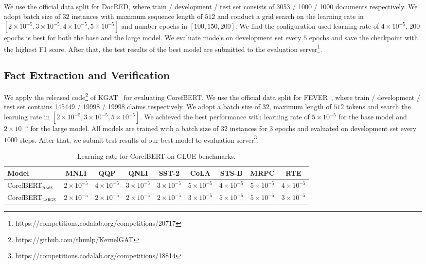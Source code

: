 \documentclass[11pt,a4paper]{article}
\newcommand\BASESIZE{$_{\small \textsc{base}}$\xspace}
\newcommand\LARGESIZE{$_{\small \textsc{large}}$\xspace}
\begin{document}
We use the official data split for DocRED, where train / development / test set consists of 3053 / 1000 / 1000 documents respectively.  We adopt batch size of $32$ instances with maximum sequence length of $512$ and conduct a grid search on the learning rate in $[2\times10^{-5}, 3\times10^{-5}, 4\times10^{-5}, 5\times10^{-5}]$ and number epochs in $[100, 150, 200]$. We find the  configuration used learning rate of $4\times10^{-5}$, $200$ epochs is best for both the base and the large model. We evaluate models on development set every $5$ epochs and save the checkpoint with the highest F1 score. After that, the test results of the best model are submitted to the evaluation server\footnote{https://competitions.codalab.org/competitions/20717}.


\subsection{Fact Extraction and Verification}

We apply the released code\footnote{https://github.com/thunlp/KernelGAT} of KGAT~\citep{Zhenghao} for evaluating CorefBERT.  We use the official data split for FEVER~\citep{Fever}, where train / development / test set contains 145449 / 19998 / 19998 claims respectively. We adopt a batch size of $32$, maximum length of $512$ tokens and search the learning rate in $[2\times10^{-5},3\times10^{-5},5\times10^{-5}]$. We achieved  the best performance  with learning rate of $5\times10^{-5}$ for the base model and $2\times10^{-5}$ for the large model. All models are trained with a batch size of $32$ instances for $3$ epochs and evaluated on development set every $1000$ steps. After that, we submit test results of our best model to evaluation server\footnote{https://competitions.codalab.org/competitions/18814}. 

\begin{table*}[!t]
\small
\centering
\begin{tabular}{l c c c c c c c c}
\toprule
Model & MNLI & QQP & QNLI & SST-2 & CoLA &  STS-B & MRPC & RTE \\
\midrule
CorefBERT\BASESIZE & $2\times10^{-5}$ &  $4\times10^{-5}$ & $3\times10^{-5}$&  $3\times10^{-5}$  & $5\times10^{-5}$ &  $4\times10^{-5}$&  $5\times10^{-5}$&  $4\times10^{-5}$\\
CorefBERT\LARGESIZE &  $2\times10^{-5}$ & $2\times10^{-5}$ & $2\times10^{-5}$ & $2\times10^{-5}$  &  $3\times10^{-5}$ & $5\times10^{-5}$ & $5\times10^{-5}$ & $3\times10^{-5}$\\
\bottomrule
\end{tabular}
\caption{Learning rate for CorefBERT on GLUE benchmarks.}
\label{gluelr}
\end{table*}
\end{document}
